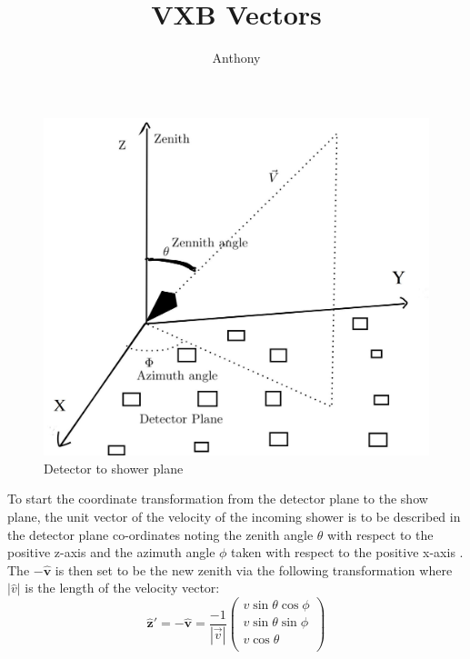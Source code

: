 \documentclass[11pt]{article}
\begin{document}
\author{Anthony}
\title{VXB Vectors}
\maketitle

\begin{figure}[h]
\centering
  \includegraphics[scale=0.2]{vvv.JPG}
  \caption{Detector to shower plane }
  \label{fig:boat1}
\end{figure}

To start the coordinate transformation from the detector plane to the show plane, the unit vector of the velocity of the incoming shower is to be  described in the detector plane co-ordinates noting the zenith angle $\theta$ with respect to the positive z-axis and the azimuth angle $\phi$ taken with respect to the positive x-axis  . The $\mathbf{-\hat{v}}$ is then set to be the new zenith via the following transformation where $|\hat{v}|$ is the length of the velocity vector:
\begin{equation}
    \mathbf{\hat{z}'}=\mathbf{-\hat{v}} = \frac{-1}{\left|\vec{v}\right|}\left(
    \begin{array}{c}
    v\sin\theta \cos\phi \\ 	
    v\sin\theta \sin\phi \\ 
    v\cos\theta \\
\end{array} 
\right)
\end{equation}
\end{document}
